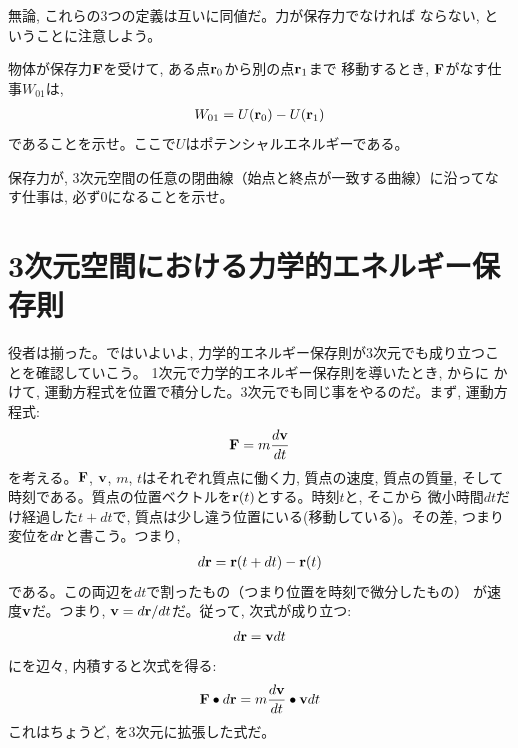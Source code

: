 無論, これらの3つの定義は互いに同値だ。力が保存力でなければ
ならない, ということに注意しよう。\mv

%
\begin{q}\label{q:3D_work_conservative}
物体が保存力${\bf F}$を受けて, ある点${\bf r}_0$から別の点${\bf r}_1$まで
移動するとき, ${\bf F}$がなす仕事$W_{01}$は, 
\begin{eqnarray}
W_{01}=U({\bf r}_0)-U({\bf r}_1)\label{3D_work_conservative}
\end{eqnarray}
であることを示せ。ここで$U$はポテンシャルエネルギーである。
\end{q}

%
\begin{q}\label{q:work_conservative_loop}
保存力が, 3次元空間の任意の閉曲線（始点と終点が一致する曲線）に沿ってなす仕事は, 必ず0になることを示せ。
\end{q}
\hv



\section{3次元空間における力学的エネルギー保存則}

役者は揃った。ではいよいよ, 力学的エネルギー保存則が3次元でも成り立つことを確認していこう。
1次元で力学的エネルギー保存則を導いたとき, からに
かけて, 運動方程式を位置で積分した。3次元でも同じ事をやるのだ。まず, 運動方程式:
\begin{eqnarray}
{\bf F}=m\frac{d{\bf v}}{dt}\label{eq:3D_cons_F_ma}
\end{eqnarray}
を考える。${\bf F}$, ${\bf v}$, $m$, $t$はそれぞれ質点に働く力, 質点の速度, 質点の質量, 
そして時刻である。質点の位置ベクトルを${\bf r}(t)$とする。時刻$t$と, そこから
微小時間$dt$だけ経過した$t+dt$で, 質点は少し違う位置にいる(移動している)。その差, 
つまり変位を$d{\bf r}$と書こう。つまり, 
\begin{eqnarray}
d{\bf r}={\bf r}(t+dt)-{\bf r}(t)
\end{eqnarray}
である。この両辺を$dt$で割ったもの（つまり位置を時刻で微分したもの）
が速度${\bf v}$だ。つまり, ${\bf v}=d{\bf r}/dt$だ。従って, 次式が成り立つ:
\begin{eqnarray}
d{\bf r}={\bf v}dt\label{eq:3D_cons_dr_vdt}
\end{eqnarray}
にを辺々, 内積すると次式を得る:
\begin{eqnarray}
{\bf F}\bullet d{\bf r}=m\frac{d{\bf v}}{dt}\bullet {\bf v}dt\label{eq:3D_WandT000}
\end{eqnarray}
これはちょうど, を3次元に拡張した式だ。

